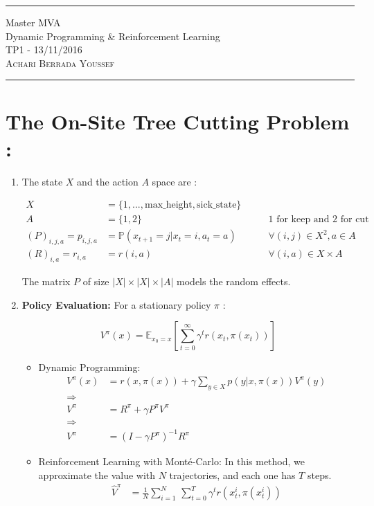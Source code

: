 \documentclass[a4paper,10pt]{article}
\begin{document}
\begin{center}
\rule{\textwidth}{3pt}
Master MVA \\
Dynamic Programming \& Reinforcement Learning \\
TP1 - 13/11/2016 \\
\textsc{ Achari Berrada Youssef} \\
\rule{\textwidth}{.3pt}
\end{center}

\section{The On-Site Tree Cutting Problem :}
\begin{enumerate}[label=\underline{\textbf{Q\arabic*}:}]

\item The state $X$ and the action $A$ space are : 

\begin{align*}
X & = \{1, ... , \text{max\_height}, \text{sick\_state}  \} &   \\
A & = \{ 1 , 2 \} & \qquad \text{1 for keep and 2 for cut} \\
(P)_{i,j,a} = p_{i,j,a} & = \mathbb{P}(x_{t+1} = j | x_t = i , a_t = a) & \qquad  \forall (i,j) \in X^2 ,  a \in A \\ 
(R)_{i,a} = r_{i,a} &  = r(i,a) & \qquad \forall (i,a) \in X \times A
\end{align*}

The matrix $P$ of size $|X| \times |X| \times |A|$ models the random effects. 

\item \textbf{Policy Evaluation: } For a stationary policy $\pi$ : 

\[   
V^{\pi}(x)  = \mathbb{E}_{x_0 = x} \left[  \sum_{t = 0}^\infty \gamma^t r(x_t,\pi(x_t)) \right]
\]
\begin{itemize}
\item Dynamic Programming:
\begin{align*}
V^{\pi}(x) & = r(x,\pi(x)) + \gamma \sum_{y \in X} p(y | x, \pi(x)) V^{\pi}(y) \\ 
\Rightarrow & \\
V^{\pi} &  = R^{\pi} + \gamma P^{\pi} V^{\pi} \\
\Rightarrow & \\ 
V^{\pi} & = (I - \gamma P^{\pi} )^{-1} R^{\pi}
\end{align*}

\item Reinforcement Learning with Mont\'e-Carlo: In this method, we approximate the value with $N$ trajectories, and each one has $T$ steps. 
\begin{align*}
\hat{V}^{\pi} & = \frac{1}{N} \sum_{i=1}^N \, \sum_{t=0}^T \gamma^t r(x_t^i , \pi(x_t^i))
\end{align*}


\end{itemize}
\end{enumerate}
\end{document}

